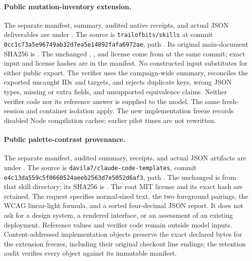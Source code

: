 \documentclass{article}
\theoremstyle{plain}
\theoremstyle{definition}
\newcommand{\id}[1]{\texttt{#1}}
\begin{document}
\paragraph{Public mutation-inventory extension.}
The separate manifest, summary, audited native receipts, and actual JSON
deliverables are under
.
The source is \id{trailofbits/skills} at commit
\id{0cc1c73a5e96749ab32d7ea5e14892fafa6972ae},
path .
Its original main-document SHA256 is
.
The unchanged , , and license
come from 
at the same commit; exact input and license hashes are in the manifest.
No constructed input substitutes for either public export. The verifier
uses the campaign-wide summary, reconciles the exported uncaught IDs and
targets, and rejects duplicate keys, wrong JSON types, missing or extra
fields, and unsupported equivalence claims. Neither verifier code nor its
reference answer is supplied to the model. The same fresh-session and
container isolation apply. The new implementation freeze records disabled
Node compilation caches; earlier pilot times are not rewritten.

\paragraph{Public palette-contrast provenance.}
The separate manifest, audited summary, receipts, and actual JSON artifacts
are under .
The source is \id{davila7/claude-code-templates}, commit
\id{e4c13da559c5f0660524aeeb2563d7e5052d6af3}, path
.
The unchanged  is from that skill directory; its
SHA256 is .
The root MIT license and its exact hash are retained. The request specifies
normal-sized text, the two foreground pairings, the WCAG linear-light
formula, and a sorted four-decimal JSON report. It does not ask for a
design system, a rendered interface, or an assessment of an existing
deployment. Reference values and verifier code remain outside model inputs.
Content-addressed implementation objects preserve the exact declared bytes
for the extension freezes, including their original checkout line endings;
the retention audit verifies every object against its immutable manifest.
\end{document}
